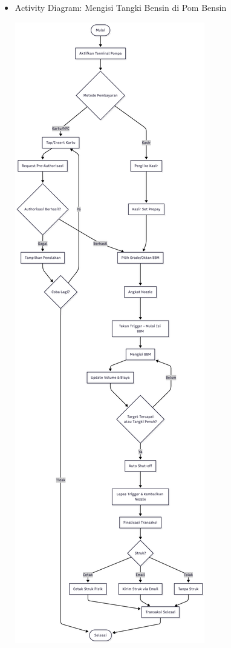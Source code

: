 \documentclass[a4paper]{article}
\begin{document}
\begin{enumerate}[itemsep=1em]
  \begin{itemize}[itemsep=1em]
    \item Activity Diagram: Mengisi Tangki Bensin di Pom Bensin
    \begin{center}
      \includegraphics[height=0.9\textheight,keepaspectratio]{fueling-activity-diagram.png}
    \end{center}
  \end{itemize}


\end{enumerate}
\end{document}

